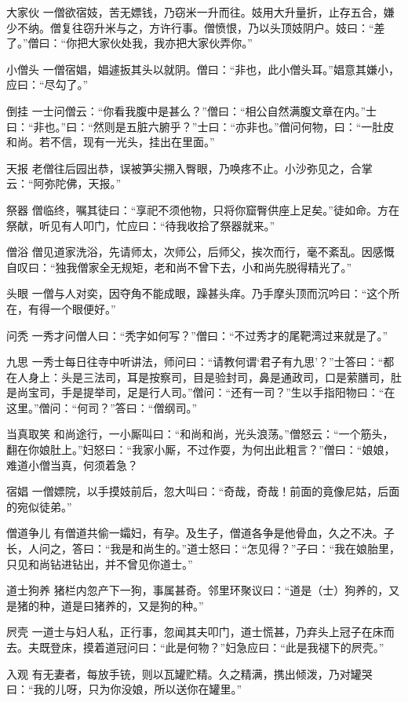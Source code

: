\documentclass[12pt,UTF8]{ctexbook}
\begin{document}
大家伙
一僧欲宿妓，苦无嫖钱，乃窃米一升而往。妓用大升量折，止存五合，嫌少不纳。僧复往窃升米与之，方许行事。僧愤恨，乃以头顶妓阴户。妓曰：“差了。”僧曰：“你把大家伙处我，我亦把大家伙弄你。”

小僧头
一僧宿娼，娼遽扳其头以就阴。僧曰：“非也，此小僧头耳。”娼意其嫌小，应曰：“尽勾了。”

倒挂
一士问僧云：“你看我腹中是甚么？”僧曰：“相公自然满腹文章在内。”士曰：“非也。”曰：“然则是五脏六腑乎？”士曰：“亦非也。”僧问何物，曰：“一肚皮和尚。若不信，现有一光头，挂出在里面。”

天报
老僧往后园出恭，误被笋尖搠入臀眼，乃唤疼不止。小沙弥见之，合掌云：“阿弥陀佛，天报。”

祭器
僧临终，嘱其徒曰：“享祀不须他物，只将你窟臀供座上足矣。”徒如命。方在祭献，听见有人叩门，忙应曰：“待我收拾了祭器就来。”

僧浴
僧见道家洗浴，先请师太，次师公，后师父，挨次而行，毫不紊乱。因感慨自叹曰：“独我僧家全无规矩，老和尚不曾下去，小和尚先脱得精光了。”

头眼
一僧与人对奕，因夺角不能成眼，躁甚头痒。乃手摩头顶而沉吟曰：“这个所在，有得一个眼便好。”

问秃
一秀才问僧人曰：“秃字如何写？”僧曰：“不过秀才的尾靶湾过来就是了。”

九思
一秀士每日往寺中听讲法，师问曰：“请教何谓‘君子有九思’？”士答曰：“都在人身上：头是三法司，耳是按察司，目是验封司，鼻是通政司，口是萦膳司，肚是尚宝司，手是提举司，足是行人司。”僧问：“还有一司？”生以手指阳物曰：“在这里。”僧问：“何司？”答曰：“僧纲司。”

当真取笑
和尚途行，一小厮叫曰：“和尚和尚，光头浪荡。”僧怒云：“一个筋头，翻在你娘肚上。”妇怒曰：“我家小厮，不过作耍，为何出此粗言？”僧曰：“娘娘，难道小僧当真，何须着急？

宿娼
一僧嫖院，以手摸妓前后，忽大叫曰：“奇哉，奇哉！前面的竟像尼姑，后面的宛似徒弟。”

僧道争儿
有僧道共偷一孀妇，有孕。及生子，僧道各争是他骨血，久之不决。子长，人问之，答曰：“我是和尚生的。”道士怒曰：“怎见得？”子曰：“我在娘胎里，只见和尚钻进钻出，并不曾见你道士。”

道士狗养
猪栏内忽产下一狗，事属甚奇。邻里环聚议曰：“道是（士）狗养的，又是猪的种，道是曰猪养的，又是狗的种。”

屄壳
一道士与妇人私，正行事，忽闻其夫叩门，道士慌甚，乃弃头上冠子在床而去。夫既登床，摸着道冠问曰：“此是何物？”妇急应曰：“此是我褪下的屄壳。”

入观
有无妻者，每放手铳，则以瓦罐贮精。久之精满，携出倾泼，乃对罐哭曰：“我的儿呀，只为你没娘，所以送你在罐里。”
\end{document}
